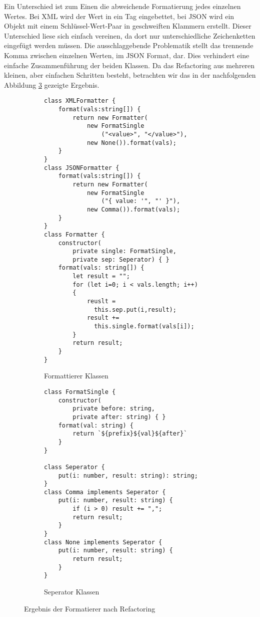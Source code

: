 Ein Unterschied ist zum Einen die abweichende Formatierung jedes einzelnen Wertes.
Bei XML wird der Wert in ein Tag eingebettet, bei JSON wird ein Objekt mit einem Schlüssel-Wert-Paar in geschweiften Klammern erstellt.
Dieser Unterschied liese sich einfach vereinen, da dort nur unterschiedliche Zeichenketten eingefügt werden müssen.
Die ausschlaggebende Problematik stellt das trennende Komma zwischen einzelnen Werten, im JSON Format, dar.
Dies verhindert eine einfache Zusammenführung der beiden Klassen.
Da das Refactoring aus mehreren kleinen, aber einfachen Schritten besteht, betrachten wir das in der nachfolgenden Abbildung \ref{fig:FormatterEnde} gezeigte Ergebnis.

\begin{figure}[ht]
    \begin{subfigure}[t]{0.49\textwidth}
        \centering
        \begin{minipage}[t]{\linewidth}
            \begin{verbatim}
class XMLFormatter {
    format(vals:string[]) {
        return new Formatter(
            new FormatSingle
                ("<value>", "</value>"),
            new None()).format(vals);
    }
}
class JSONFormatter {
    format(vals:string[]) {
        return new Formatter(
            new FormatSingle
                ("{ value: '", "' }"),
            new Comma()).format(vals);
    }
}
class Formatter {
    constructor(
        private single: FormatSingle,
        private sep: Seperator) { }
    format(vals: string[]) {
        let result = "";
        for (let i=0; i < vals.length; i++) 
        {
            reuslt = 
              this.sep.put(i,result);
            result += 
              this.single.format(vals[i]);
        }
        return result;
    }
}
            \end{verbatim}
        \end{minipage}
        \caption{Formattierer Klassen}
        \label{fig:gleichGut1}
    \end{subfigure}
    \hfill
    \begin{subfigure}[t]{0.49\textwidth}
        \centering
        \begin{minipage}[t]{\linewidth}
            \begin{verbatim}
class FormatSingle {
    constructor(
        private before: string,
        private after: string) { }
    format(val: string) {
        return `${prefix}${val}${after}`
    }
}

class Seperator {
    put(i: number, result: string): string;
}
class Comma implements Seperator {
    put(i: number, result: string) {
        if (i > 0) result += ",";
        return result;
    }
}
class None implements Seperator {
    put(i: number, result: string) {
        return result;
    }
}
            \end{verbatim}
        \end{minipage}
        \caption{Seperator Klassen}
        \label{fig:gleichGut2}
    \end{subfigure}
    \caption{Ergebnis der Formatierer nach Refactoring \citep[S. 329 f.]{fiveLines.2023}}
    \label{fig:FormatterEnde}
\end{figure}
